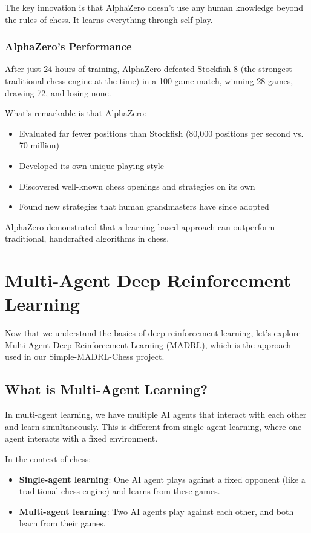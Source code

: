 \documentclass[11pt]{article}
\begin{document}
The key innovation is that AlphaZero doesn't use any human knowledge beyond the rules of chess. It learns everything through self-play.

\subsubsection{AlphaZero's Performance}

After just 24 hours of training, AlphaZero defeated Stockfish 8 (the strongest traditional chess engine at the time) in a 100-game match, winning 28 games, drawing 72, and losing none.

What's remarkable is that AlphaZero:
\begin{itemize}
    \item Evaluated far fewer positions than Stockfish (80,000 positions per second vs. 70 million)
    \item Developed its own unique playing style
    \item Discovered well-known chess openings and strategies on its own
    \item Found new strategies that human grandmasters have since adopted
\end{itemize}

AlphaZero demonstrated that a learning-based approach can outperform traditional, handcrafted algorithms in chess.

\section{Multi-Agent Deep Reinforcement Learning}

Now that we understand the basics of deep reinforcement learning, let's explore Multi-Agent Deep Reinforcement Learning (MADRL), which is the approach used in our Simple-MADRL-Chess project.

\subsection{What is Multi-Agent Learning?}

In multi-agent learning, we have multiple AI agents that interact with each other and learn simultaneously. This is different from single-agent learning, where one agent interacts with a fixed environment.

In the context of chess:
\begin{itemize}
    \item \textbf{Single-agent learning}: One AI agent plays against a fixed opponent (like a traditional chess engine) and learns from these games.
    \item \textbf{Multi-agent learning}: Two AI agents play against each other, and both learn from their games.
\end{itemize}
\end{document}

